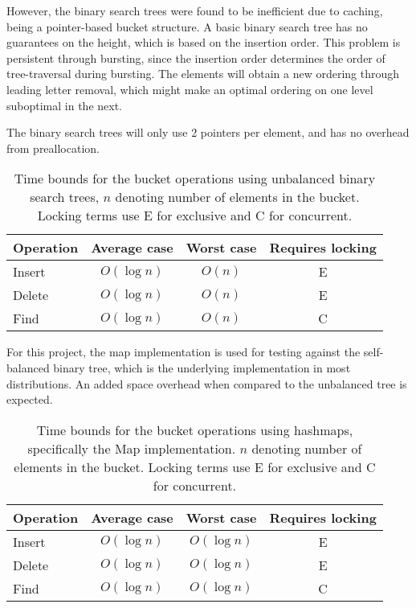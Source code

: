 However, the binary search trees were found to be inefficient due to
caching\cite{Nash:2008}, being a pointer-based bucket structure. A basic binary
search tree has no guarantees on the height, which is based on the insertion
order. This problem is persistent through bursting, since the insertion order
determines the order of tree-traversal during bursting. The elements will obtain
a new ordering through leading letter removal, which might make an optimal ordering
on one level suboptimal in the next.

The binary search trees will only use 2 pointers per element, and
has no overhead from preallocation. 

\begin{table}[h!]
    \centering
    \begin{tabular}[here]{ l || c | c | c}
        Operation & Average case & Worst case & Requires locking  \\ \hline
        Insert    & $O(\log n)$ & $O(n)$ & E \\ \hline
        Delete    & $O(\log n)$ & $O(n)$ & E \\ \hline
        Find      & $O(\log n)$ & $O(n)$ & C \\ \hline
    \end{tabular}
    \caption{Time bounds for the bucket operations using unbalanced binary
    search trees, $n$ denoting number of elements in the bucket. Locking terms
    use E for exclusive and C for concurrent.}
    \label{tab:bounds:bst}
\end{table}


For this project, the \STL map implementation is used for testing against the
self-balanced binary tree, which is the underlying implementation in most
distributions. An added space overhead when compared to the unbalanced tree is
expected.

\begin{table}[h!]
    \centering
    \begin{tabular}[here]{ l || c | c | c}
        Operation & Average case & Worst case & Requires locking  \\ \hline
        Insert    & $O(\log n)$  & $O(\log n)$ & E \\ \hline
        Delete    & $O(\log n)$  & $O(\log n)$ & E \\ \hline
        Find      & $O(\log n)$  & $O(\log n)$ & C \\ \hline
    \end{tabular}
    \caption{Time bounds for the bucket operations using hashmaps, specifically
    the \STL Map implementation. $n$ denoting number of elements in the
    bucket. Locking terms use E for exclusive and C for concurrent.}

    \label{tab:bounds:map}
\end{table}

